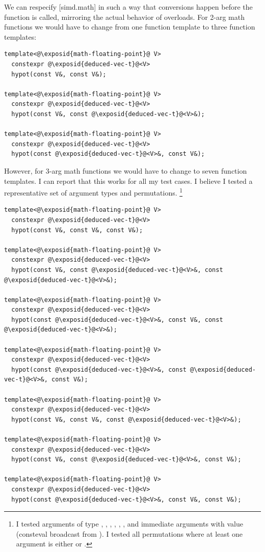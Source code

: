 We can respecify [simd.math] in such a way that conversions happen before the function is called,
mirroring the actual behavior of  overloads.
For 2-arg math functions we would have to change from one function template to three function
templates:
\medskip\begin{lstlisting}[style=Vc]
template<@\exposid{math-floating-point}@ V>
  constexpr @\exposid{deduced-vec-t}@<V>
  hypot(const V&, const V&);

template<@\exposid{math-floating-point}@ V>
  constexpr @\exposid{deduced-vec-t}@<V>
  hypot(const V&, const @\exposid{deduced-vec-t}@<V>&);

template<@\exposid{math-floating-point}@ V>
  constexpr @\exposid{deduced-vec-t}@<V>
  hypot(const @\exposid{deduced-vec-t}@<V>&, const V&);
\end{lstlisting}
However, for 3-arg math functions we would have to change to seven function templates.
I can report that this works for all my test cases.
I believe I tested a representative set of argument types and permutations.%
\footnote{I tested arguments of type ,
  , , , ,
  , and immediate arguments with value  (consteval broadcast from ). I
  tested all permutations where at least one argument is either  or
  .
}
\medskip\begin{lstlisting}[style=Vc]
template<@\exposid{math-floating-point}@ V>
  constexpr @\exposid{deduced-vec-t}@<V>
  hypot(const V&, const V&, const V&);

template<@\exposid{math-floating-point}@ V>
  constexpr @\exposid{deduced-vec-t}@<V>
  hypot(const V&, const @\exposid{deduced-vec-t}@<V>&, const @\exposid{deduced-vec-t}@<V>&);

template<@\exposid{math-floating-point}@ V>
  constexpr @\exposid{deduced-vec-t}@<V>
  hypot(const @\exposid{deduced-vec-t}@<V>&, const V&, const @\exposid{deduced-vec-t}@<V>&);

template<@\exposid{math-floating-point}@ V>
  constexpr @\exposid{deduced-vec-t}@<V>
  hypot(const @\exposid{deduced-vec-t}@<V>&, const @\exposid{deduced-vec-t}@<V>&, const V&);

template<@\exposid{math-floating-point}@ V>
  constexpr @\exposid{deduced-vec-t}@<V>
  hypot(const V&, const V&, const @\exposid{deduced-vec-t}@<V>&);

template<@\exposid{math-floating-point}@ V>
  constexpr @\exposid{deduced-vec-t}@<V>
  hypot(const V&, const @\exposid{deduced-vec-t}@<V>&, const V&);

template<@\exposid{math-floating-point}@ V>
  constexpr @\exposid{deduced-vec-t}@<V>
  hypot(const @\exposid{deduced-vec-t}@<V>&, const V&, const V&);
\end{lstlisting}

